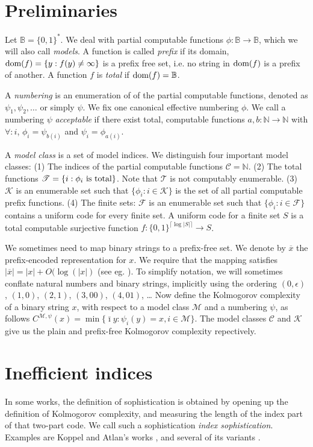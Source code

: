 \documentclass{style/llncs}
\newcommand{\M}{\mathscr M}
\newcommand{\C}{\mathscr C}
\newcommand{\T}{\mathscr T}
\newcommand{\F}{\mathscr F}
\newcommand{\K}{\mathscr K}
\newcommand{\B}{\mathbb B}
\newcommand{\N}{\mathbb N}
\newcommand{\tn}[1]{\textnormal{#1}}
\newcommand{\br}[1]{\overline{#1}}
\newcommand{\dom}[1]{\mathop{\tn{dom}(#1)}}
\begin{document}
\section{Preliminaries}
Let $\B = \{0,1\}^*$. We deal with partial computable functions $\phi: \B \to \B$, which we will also call \emph{models}. A function is called \emph{prefix} if its domain, $\dom{f} = \{y : f(y) \neq \infty\}$ is a prefix free set, i.e. no string in $\dom{f}$ is a prefix of another. A function $f$ is \emph{total} if $\dom{f} = \B$.

A \emph{numbering} is an enumeration of of the partial computable functions, denoted as $\psi_1, \psi_2, \ldots$ or simply $\psi$. We fix one canonical effective numbering $\phi$. We call a numbering $\psi$ \emph{acceptable} if there exist total, computable functions $a, b: \N \to \N$ with $\forall: i$, $\phi_i = \psi_{b(i)}$ and  $\psi_i = \phi_{a(i)}$.

A \emph{model class} is a set of model indices. We distinguish four important model classes: (1) The indices of the partial computable functions $\C=\N$. (2) The total functions $\T=\{i:\tn{$\phi_i$ is total}\}$. Note that $\T$ is not computably enumerable. (3) $\K$ is an enumerable set such that $\{\phi_i:i\in\K\}$ is the set of all partial computable prefix functions. (4) The finite sets: $\F$ is an enumerable set such that $\{\phi_i:i\in\F\}$ contains a uniform code for every finite set. A uniform code for a finite set $S$ is a total computable surjective function $f:\{0,1\}^{\lceil\log|S|\rceil}\to S$.

We sometimes need to map binary strings to a prefix-free set. We denote by $\br{x}$ the prefix-encoded representation for $x$. We require that the mapping satisfies $|\br{x}| = |x|+O(\log(|x|)$ (see eg. \cite[Section~1.4]{li1993introduction}). To simplify notation, we will sometimes conflate natural numbers and binary strings, implicitly using the ordering $(0, \epsilon)$, $(1, 0)$, $(2, 1)$, $(3, 00)$, $(4, 01)$, \ldots 
Now define the Kolmogorov complexity of a binary string $x$, with respect to a model class $\M$ and a numbering $\psi$, as follows $C^{\M,\psi}(x)=\min\{\bar\imath y:\psi_i(y)=x,i\in\M\}$. The model classes $\C$ and $\K$ give us the plain and prefix-free Kolmogorov complexity repectively.

\section{Inefficient indices}
\label{section:indices}
In some works, the definition of sophistication is obtained by opening up the definition of Kolmogorov complexity, and measuring the length of the index part of that two-part code. We call such a sophistication \emph{index sophistication}. Examples are Koppel and Atlan's works \cite{koppelSoph1988,koppel1991almost},  and several of its variants \cite{antunes2009sophistication,antunes2013sophistication}. 
\end{document}
